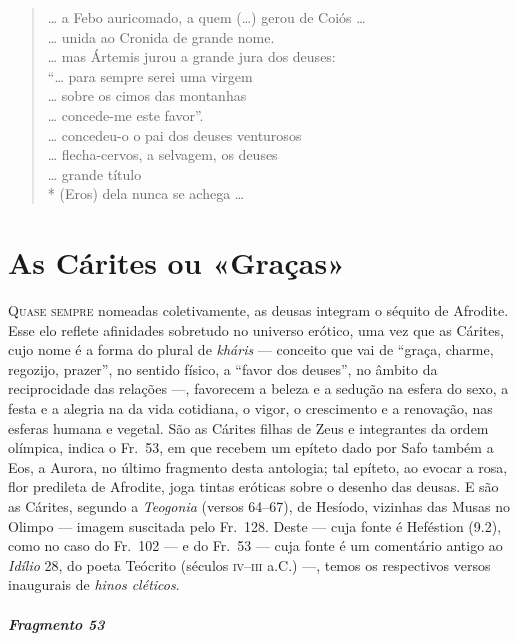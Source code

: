 \begin{verse}
\ldots{} a Febo auricomado, a quem (\ldots{}) gerou de \qb{}Coiós \ldots{}\\
\ldots{} unida ao Cronida de grande nome.\\
\ldots{} mas Ártemis jurou a grande jura dos \qb{}deuses:\\
``\ldots{} para sempre serei uma virgem\\
\ldots{} sobre os cimos das montanhas\\
\ldots{} concede-me este favor''.\\
\ldots{} concedeu-o o pai dos deuses venturosos\\
\ldots{} flecha-cervos, a selvagem, os deuses\\
\ldots{} grande título\\*
(Eros) dela nunca se achega \ldots{}
\end{verse}


\chapter{As Cárites ou «Graças»}

\textsc{Quase sempre} nomeadas coletivamente, as deusas integram o séquito de Afrodite.
Esse elo reflete afinidades sobretudo no universo erótico, uma vez que as
Cárites, cujo nome é a forma do plural de \textit{kháris }--- conceito que vai de
“graça, charme, regozijo, prazer”, no sentido físico, a “favor dos deuses”, no
âmbito da reciprocidade das relações ---, favorecem a beleza e a sedução na
esfera do sexo, a festa e a alegria na da vida cotidiana, o vigor, o
crescimento e a renovação, nas esferas humana e vegetal. São as Cárites
filhas de Zeus e integrantes da ordem olímpica, indica o Fr.~53, em que
recebem um epíteto dado por Safo também a Eos, a Aurora, no último fragmento desta antologia;
tal epíteto, ao evocar a rosa, flor predileta de Afrodite, joga tintas eróticas
sobre o desenho das deusas. E são as Cárites, segundo a \textit{Teogonia}
(versos 64--67), de Hesíodo, vizinhas das Musas no Olimpo --- imagem suscitada
pelo Fr.~128. Deste --- cuja fonte é Heféstion (9.2), como no caso do Fr.~102 --- e do		\EP[]
Fr.~53 --- cuja fonte é um comentário antigo ao \textit{Idílio }28, do poeta
Teócrito (séculos \textsc{iv}--\textsc{iii} a.C.) ---, temos os respectivos versos inaugurais de
\textit{hinos cléticos}.
\pagebreak

\paragraph{Fragmento 53} \

